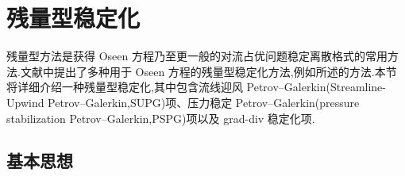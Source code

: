 \section{残量型稳定化}\label{sec:oseen-residual-stabilization}

\begin{note}[残量型稳定化]\label{note:oseen-residual-stabilization}
残量型方法是获得 Oseen 方程乃至更一般的对流占优问题稳定离散格式的常用方法.文献中提出了多种用于 Oseen 方程的残量型稳定化方法,例如\textcite{BraackBurmanJohnLube2007}所述的方法.本节将详细介绍一种残量型稳定化,其中包含流线迎风 Petrov--Galerkin(Streamline-Upwind Petrov--Galerkin,SUPG)项、压力稳定 Petrov--Galerkin(pressure stabilization Petrov--Galerkin,PSPG)项以及 grad-div 稳定化项.
\end{note}

\subsection{基本思想}\label{subsec:oseen-residual-basic-idea}

